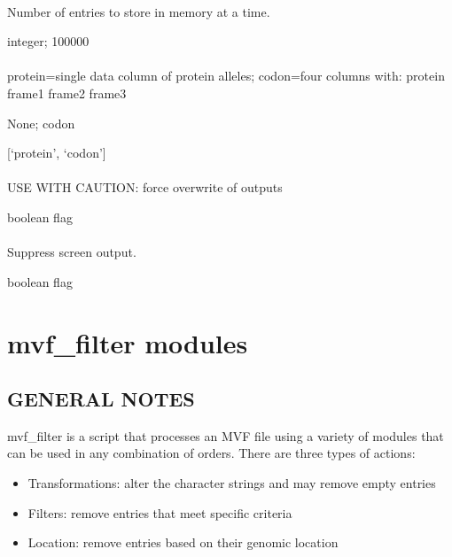 \documentclass[letterpaper,11pt,english]{sphinxmanual}
\begin{document}
\subsubsection{}
\label{\detokenize{prog_desc:id155}}
 Number of entries to store in memory at a time.

 integer;  100000


\subsubsection{}
\label{\detokenize{prog_desc:id156}}
 protein=single data column of protein alleles; codon=four columns with: protein frame1 frame2 frame3

 None;  codon

 {[}‘protein’, ‘codon’{]}


\subsubsection{}
\label{\detokenize{prog_desc:id157}}
 USE WITH CAUTION: force overwrite of outputs

 boolean flag


\subsubsection{}
\label{\detokenize{prog_desc:id158}}
 Suppress screen output.

 boolean flag


\chapter{mvf\_filter modules}
\label{\detokenize{mvf_filter_modules:mvf-filter-modules}}\label{\detokenize{mvf_filter_modules::doc}}

\section{GENERAL NOTES}
\label{\detokenize{mvf_filter_modules:general-notes}}
mvf\_filter is a script that processes an MVF file using a variety
of modules that can be used in any combination of orders.  There
are three types of actions:
\begin{itemize}
\item {} 
Transformations: alter the character strings and may remove empty entries

\item {} 
Filters: remove entries that meet specific criteria

\item {} 
Location: remove entries based on their genomic location

\end{itemize}
\end{document}
